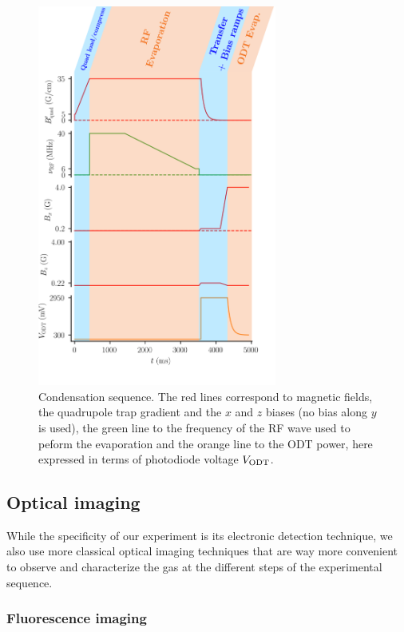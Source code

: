\begin{figure}
    \centering
    \includegraphics[width=0.7\textwidth]{Fig/Chapter3/condensation_sequence.png}
    \caption[Condensation sequence]{Condensation sequence. The red lines correspond to magnetic fields, \ie the quadrupole trap gradient and the $x$ and $z$ biases (no bias along $y$ is used), the green line to the frequency of the RF wave used to peform the evaporation and the orange line to the ODT power, here expressed in terms of photodiode voltage $V_{\rm{ODT}}$.}
    \label{fig:my_label}
\end{figure}

\subsection{Optical imaging}

While the specificity of our experiment is its electronic detection technique, we also use more classical optical imaging techniques that are way more convenient to observe and characterize the gas at the different steps of the experimental sequence.

\subsubsection{Fluorescence imaging}

